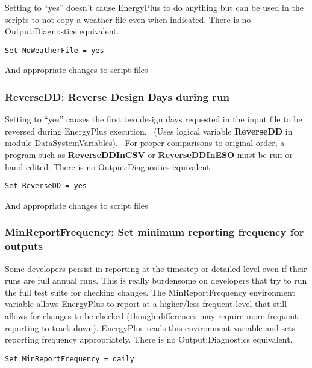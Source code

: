 Setting to ``yes'' doesn't cause EnergyPlus to do anything but can be used in the scripts to not copy a weather file even when indicated. There is no Output:Diagnostics equivalent.

\begin{lstlisting}
Set NoWeatherFile = yes
\end{lstlisting}

And appropriate changes to script files

\subsubsection{ReverseDD: Reverse Design Days during run}\label{reversedd-reverse-design-days-during-run}

Setting to ``yes'' causes the first two design days requested in the input file to be reversed during EnergyPlus execution.~ (Uses logical variable \textbf{ReverseDD} in module DataSystemVariables).~ For proper comparisons to original order, a program such as \textbf{ReverseDDInCSV} or \textbf{ReverseDDInESO} must be run or hand edited. There is no Output:Diagnostics equivalent.

\begin{lstlisting}
Set ReverseDD = yes
\end{lstlisting}

And appropriate changes to script files

\subsubsection{MinReportFrequency: Set minimum reporting frequency for outputs}\label{minreportfrequency-set-minimum-reporting-frequency-for-outputs}

Some developers persist in reporting at the timestep or detailed level even if their runs are full annual runs. This is really burdensome on developers that try to run the full test suite for checking changes. The MinReportFrequency environment variable allows EnergyPlus to report at a higher/less frequent level that still allows for changes to be checked (though differences may require more frequent reporting to track down). EnergyPlus reads this environment variable and sets reporting frequency appropriately. There is no Output:Diagnostics equivalent.

\begin{lstlisting}
Set MinReportFrequency = daily
\end{lstlisting}

